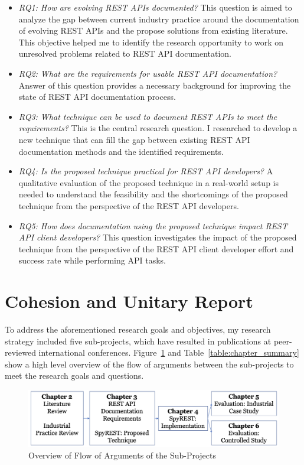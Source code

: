 \begin{itemize}
  \item \textit{RQ1: How are evolving REST APIs documented?} This question is aimed to analyze the gap between current industry practice around the documentation of evolving REST APIs and the propose solutions from existing literature. This objective helped me to identify the research opportunity to work on unresolved problems related to REST API documentation.
  \item \textit{RQ2: What are the requirements for usable REST API documentation?} Answer of this question provides a necessary background for improving the state of REST API documentation process.
  \item \textit{RQ3: What technique can be used to document REST APIs to meet the requirements?} This is the central research question. I researched to develop a new technique that can fill the gap between existing REST API documentation methods and the identified requirements.
  \item \textit{RQ4: Is the proposed technique practical for REST API developers?} A qualitative evaluation of the proposed technique in a real-world setup is needed to understand the feasibility and the shortcomings of the proposed technique from the perspective of the REST API developers.
  \item \textit{RQ5: How does documentation using the proposed technique impact REST API client developers?} This question investigates the impact of the proposed technique from the perspective of the REST API client developer effort and success rate while performing API tasks.
\end{itemize}

\section{Cohesion and Unitary Report}
To address the aforementioned research goals and objectives, my research strategy included five sub-projects, which have resulted in publications at peer-reviewed international conferences. Figure~\ref{fig:flow} and Table~\ref{table:chapter_summary} show a high level overview of the flow of arguments between the sub-projects to meet the research goals and questions.

\begin{figure}[htb]
  \includegraphics[width=\linewidth]{flow.png}
  \caption{Overview of Flow of Arguments of the Sub-Projects }
  \label{fig:flow}
\end{figure}


